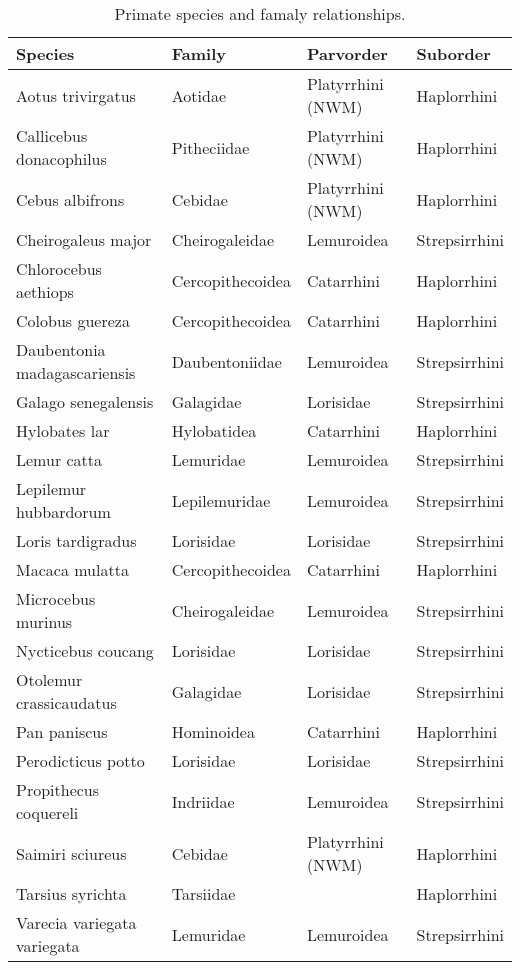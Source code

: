 \begin{table}[h!]
\centering
\caption{\small Primate species and famaly relationships.}
\begin{tabular}{l l l l}
\hline
\textbf{Species} & \textbf{Family} & \textbf{Parvorder} & \textbf{Suborder} \\ 
\hline
Aotus trivirgatus & Aotidae & Platyrrhini (NWM) & Haplorrhini \\
Callicebus donacophilus & Pitheciidae & Platyrrhini (NWM) & Haplorrhini \\
Cebus albifrons & Cebidae & Platyrrhini (NWM) & Haplorrhini \\
Cheirogaleus major & Cheirogaleidae & Lemuroidea & Strepsirrhini \\
Chlorocebus aethiops & Cercopithecoidea & Catarrhini & Haplorrhini \\
Colobus guereza & Cercopithecoidea & Catarrhini & Haplorrhini \\
Daubentonia madagascariensis & Daubentoniidae & Lemuroidea & Strepsirrhini \\
Galago senegalensis & Galagidae & Lorisidae & Strepsirrhini \\
Hylobates lar & Hylobatidea & Catarrhini & Haplorrhini \\
Lemur catta & Lemuridae & Lemuroidea & Strepsirrhini \\
Lepilemur hubbardorum & Lepilemuridae & Lemuroidea & Strepsirrhini \\
Loris tardigradus & Lorisidae & Lorisidae & Strepsirrhini \\
Macaca mulatta & Cercopithecoidea & Catarrhini & Haplorrhini \\
Microcebus murinus & Cheirogaleidae & Lemuroidea & Strepsirrhini \\
Nycticebus coucang & Lorisidae & Lorisidae & Strepsirrhini \\
Otolemur crassicaudatus & Galagidae & Lorisidae & Strepsirrhini \\
Pan paniscus & Hominoidea & Catarrhini & Haplorrhini \\
Perodicticus potto & Lorisidae & Lorisidae & Strepsirrhini \\
Propithecus coquereli & Indriidae & Lemuroidea & Strepsirrhini \\
Saimiri sciureus & Cebidae & Platyrrhini (NWM) & Haplorrhini \\
Tarsius syrichta & Tarsiidae &  & Haplorrhini \\
Varecia variegata variegata & Lemuridae & Lemuroidea & Strepsirrhini \\
\hline
\end{tabular}
\label{tab:primates}
\end{table}




